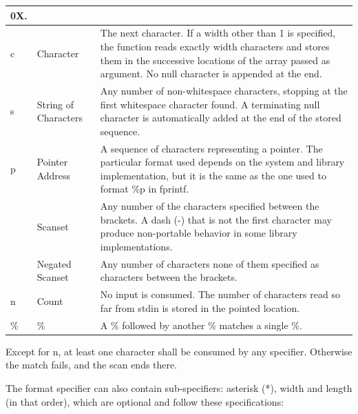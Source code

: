 \documentclass[10pt]{article}
\begin{document}
\begin{center}
\begin{tabularx}{\linewidth}{|l|l|*{1}{>{\RaggedRight\arraybackslash}X|}}
                                                0X. \\
        \hline
        c & Character & The next character. If a width other than 1 is
                        specified, the function reads exactly width characters
                        and stores them in the successive locations of the array
                        passed as argument. No null character is appended at the
                        end. \\
        \hline
        s & String of Characters & Any number of non-whitespace characters,
                                    stopping at the first whitespace character
                                    found. A terminating null character is
                                    automatically added at the end of the stored
                                    sequence. \\
        \hline
        p & Pointer Address & A sequence of characters representing a pointer.
                                The particular format used depends on the system
                                and library implementation, but it is the same
                                as the one used to format \%p in fprintf. \\
        \hline
        [characters] & Scanset & Any number of the characters specified between
                                    the brackets. A dash (-) that is not the
                                    first character may produce non-portable
                                    behavior in some library implementations. \\
        \hline
        [\^{}characters] & Negated Scanset & Any number of characters none of them
                                            specified as characters between the
                                            brackets. \\
        \hline
        n & Count & No input is consumed. The number of characters read so far
                    from stdin is stored in the pointed location. \\
        \hline
        \% & \% & A \% followed by another \% matches a single \%. \\
        \hline
    \end{tabularx}
\end{center}

Except for n, at least one character shall be consumed by any specifier.
Otherwise the match fails, and the scan ends there.

The format specifier can also contain sub-specifiers: asterisk (*), width and
length (in that order), which are optional and follow these specifications:
\end{document}
